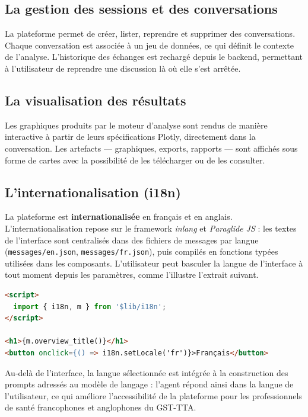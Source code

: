\subsection{La gestion des sessions et des conversations}

La plateforme permet de créer, lister, reprendre et supprimer des conversations. Chaque conversation est associée à un jeu de données, ce qui définit le contexte de l'analyse. L'historique des échanges est rechargé depuis le backend, permettant à l'utilisateur de reprendre une discussion là où elle s'est arrêtée.

\subsection{La visualisation des résultats}

Les graphiques produits par le moteur d'analyse sont rendus de manière interactive à partir de leurs spécifications Plotly, directement dans la conversation. Les artefacts — graphiques, exports, rapports — sont affichés sous forme de cartes avec la possibilité de les télécharger ou de les consulter.

\subsection{L'internationalisation (i18n)}

La plateforme est \textbf{internationalisée} en français et en anglais. L'internationalisation repose sur le framework \textit{inlang} et \textit{Paraglide JS} : les textes de l'interface sont centralisés dans des fichiers de messages par langue (\texttt{messages/en.json}, \texttt{messages/fr.json}), puis compilés en fonctions typées utilisées dans les composants. L'utilisateur peut basculer la langue de l'interface à tout moment depuis les paramètres, comme l'illustre l'extrait suivant.

\begin{lstlisting}[language=HTML, caption={Utilisation de l'internationalisation dans un composant}]
<script>
  import { i18n, m } from '$lib/i18n';
</script>

<h1>{m.overview_title()}</h1>
<button onclick={() => i18n.setLocale('fr')}>Français</button>
\end{lstlisting}

Au-delà de l'interface, la langue sélectionnée est intégrée à la construction des prompts adressés au modèle de langage : l'agent répond ainsi dans la langue de l'utilisateur, ce qui améliore l'accessibilité de la plateforme pour les professionnels de santé francophones et anglophones du GST-TTA.

